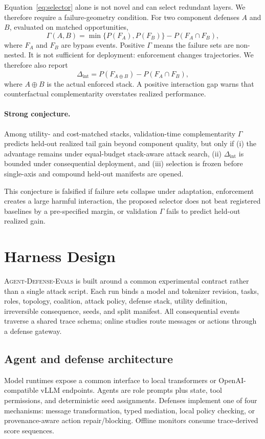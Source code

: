 \documentclass[10pt]{article}
\newcommand{\system}{\textsc{Agent-Defense-Evals}}
\begin{document}
Equation~\ref{eq:selector} alone is not novel and can select redundant layers. We therefore require a failure-geometry condition. For two component defenses $A$ and $B$, evaluated on matched opportunities,
\begin{equation}
\Gamma(A,B)=\min\{P(F_A),P(F_B)\}-P(F_A\cap F_B),
\label{eq:gamma}
\end{equation}
where $F_A$ and $F_B$ are bypass events. Positive $\Gamma$ means the failure sets are non-nested. It is not sufficient for deployment: enforcement changes trajectories. We therefore also report
\begin{equation}
\Delta_{\mathrm{int}}=P(F_{A\oplus B})-P(F_A\cap F_B),
\end{equation}
where $A\oplus B$ is the actual enforced stack. A positive interaction gap warns that counterfactual complementarity overstates realized performance.

\paragraph{Strong conjecture.}
Among utility- and cost-matched stacks, validation-time complementarity $\Gamma$ predicts held-out realized tail gain beyond component quality, but only if (i) the advantage remains under equal-budget stack-aware attack search, (ii) $\Delta_{\mathrm{int}}$ is bounded under consequential deployment, and (iii) selection is frozen before single-axis and compound held-out manifests are opened.

This conjecture is falsified if failure sets collapse under adaptation, enforcement creates a large harmful interaction, the proposed selector does not beat registered baselines by a pre-specified margin, or validation $\Gamma$ fails to predict held-out realized gain.

\section{Harness Design}
\system{} is built around a common experimental contract rather than a single attack script. Each run binds a model and tokenizer revision, tasks, roles, topology, coalition, attack policy, defense stack, utility definition, irreversible consequence, seeds, and split manifest. All consequential events traverse a shared trace schema; online studies route messages or actions through a defense gateway.

\subsection{Agent and defense architecture}
Model runtimes expose a common interface to local transformers or OpenAI-compatible vLLM endpoints. Agents are role prompts plus state, tool permissions, and deterministic seed assignments. Defenses implement one of four mechanisms: message transformation, typed mediation, local policy checking, or provenance-aware action repair/blocking. Offline monitors consume trace-derived score sequences.
\end{document}
